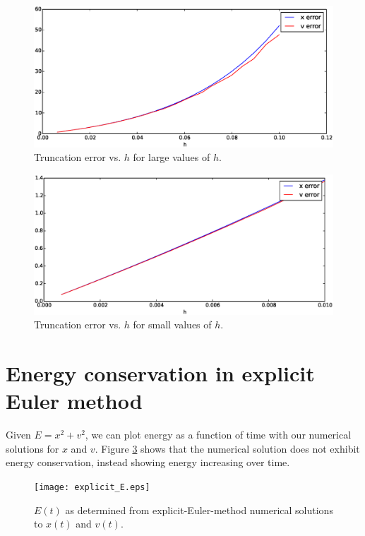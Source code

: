 \documentclass{article}
\theoremstyle{definition}
\renewcommand{\>}{\rangle}
\newcommand{\<}{\langle}
\begin{document}
\begin{figure}
\includegraphics[width=\textwidth]{bigh.eps}
\caption{\label{fig:bigh}Truncation error vs. $h$ for large values of
$h$.}
\end{figure}

\begin{figure}
\includegraphics[width=\textwidth]{smallh.eps}
\caption{\label{fig:smallh}Truncation error vs. $h$ for small values of
$h$.}
\end{figure}

\section{Energy conservation in explicit Euler method}

Given $E=x^2+v^2$, we can plot energy as a function of time with our
numerical solutions for $x$ and $v$. Figure \ref{fig:explicit_E} shows
that the numerical solution does not exhibit energy conservation, instead
showing energy increasing over time.

\begin{figure}
\texttt{[image: explicit\_E.eps]}
\caption{\label{fig:explicit_E}$E(t)$ as determined from explicit-Euler-method numerical
solutions to $x(t)$ and $v(t)$.}
\end{figure}
\end{document}
